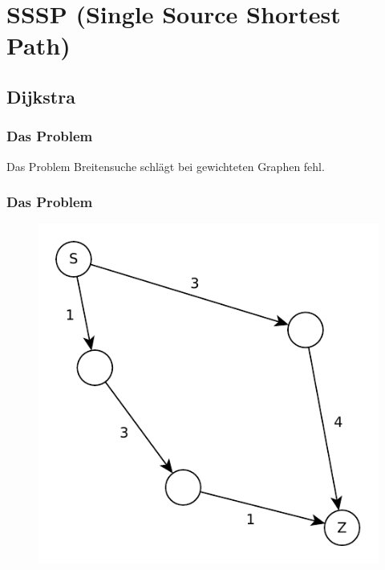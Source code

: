 \section{SSSP (Single Source Shortest Path)}
\subsection{Dijkstra}
\begin{frame}
\frametitle{Das Problem}
\begin{block}{Das Problem}
Breitensuche schlägt bei gewichteten Graphen fehl.
\end{block}
\end{frame}

\begin{frame}
\frametitle{Das Problem}
\begin{figure}
\includegraphics[scale=.8]{dijkstra_graphs/bfs_fail_0.pdf}
\end{figure}
\end{frame}

